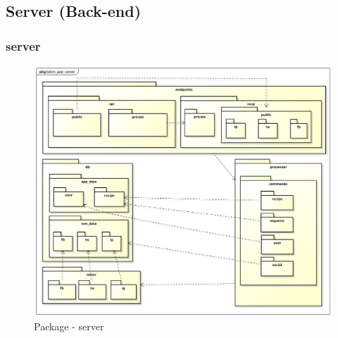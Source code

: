 


\subsection{Server (Back-end)} %
\label{sub:server}

  \subsubsection{server} %
  \begin{figure}[htbp]
    \centering
    \centerline{\includegraphics[scale=0.38]{./images/server/server.pdf}}
    \caption{Package - server}
  \end{figure}


